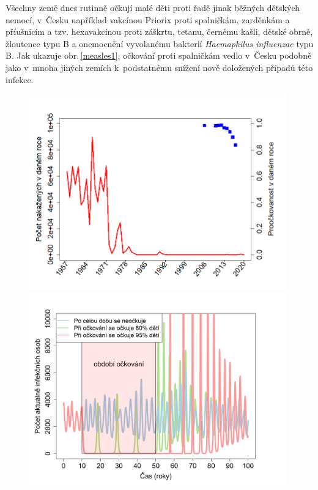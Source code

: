 Všechny země dnes rutinně očkují malé děti proti řadě jinak běžných dětských nemocí, v~Česku například vakcínou Priorix proti spalničkám, zarděnkám a příušnicím a tzv. hexavakcínou proti záškrtu, tetanu, černému kašli, dětské obrně, žloutence typu B a onemocnění vyvolanému bakterií \emph{Haemaphilus influenzae} typu B. Jak ukazuje obr.\,\ref{measles1}, očkování proti spalničkám vedlo v~Česku podobně jako v~mnoha jiných zemích k~podstatnému snížení nově doložených případů této infekce.

\begin{figure}[ht]
	\begin{center}
		\begin{minipage}[m]{0.45\linewidth}
			\includegraphics[width=0.99\textwidth]{pic/measles_data.png}
		\end{minipage}
		\hspace{2ex}
		\begin{minipage}[m]{0.45\linewidth}
			\includegraphics[width=0.99\textwidth]{pic/spalnicky2.png}

\end{minipage}
\end{center}
\end{figure}
